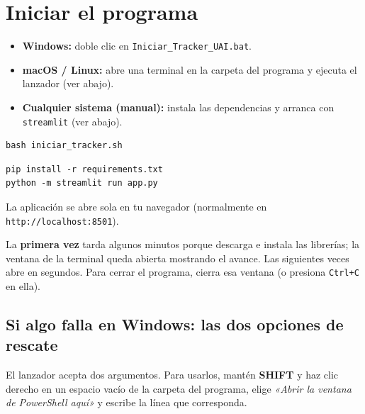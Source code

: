 \documentclass[11pt,a4paper]{article}
\begin{document}
\section{Iniciar el programa}

\begin{receta}
  \begin{itemize}
    \item \textbf{Windows:} doble clic en \texttt{Iniciar\_Tracker\_UAI.bat}.
    \item \textbf{macOS / Linux:} abre una terminal en la carpeta del programa y
      ejecuta el lanzador (ver abajo).
    \item \textbf{Cualquier sistema (manual):} instala las dependencias y arranca
      con \texttt{streamlit} (ver abajo).
  \end{itemize}
\end{receta}

\begin{lstlisting}[caption={macOS / Linux: lanzador.}]
bash iniciar_tracker.sh
\end{lstlisting}

\begin{lstlisting}[caption={Método manual, cualquier sistema.}]
pip install -r requirements.txt
python -m streamlit run app.py
\end{lstlisting}

La aplicación se abre sola en tu navegador (normalmente en
\texttt{http://localhost:8501}).

\begin{obs}
  La \textbf{primera vez} tarda algunos minutos porque descarga e instala las
  librerías; la ventana de la terminal queda abierta mostrando el avance. Las
  siguientes veces abre en segundos. Para cerrar el programa, cierra esa ventana
  (o presiona \texttt{Ctrl+C} en ella).
\end{obs}

\subsection{Si algo falla en Windows: las dos opciones de rescate}

El lanzador acepta dos argumentos. Para usarlos, mantén \textbf{SHIFT} y haz
clic derecho en un espacio vacío de la carpeta del programa, elige
\emph{«Abrir la ventana de PowerShell aquí»} y escribe la línea que
corresponda.
\end{document}
